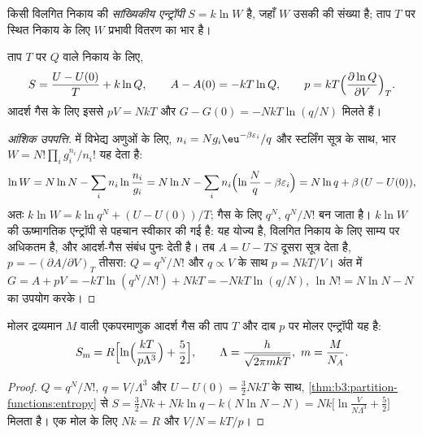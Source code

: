 \begin{definition}[सांख्यिकीय एन्ट्रॉपी]\label{def:b3:partition-functions:statistical-entropy}
किसी विलगित निकाय की \emph{सांख्यिकीय एन्ट्रॉपी}
$S = k\ln W$ है, जहाँ $W$ उसकी  की संख्या है; ताप
$T$ पर स्थित निकाय के लिए $W$ प्रभावी वितरण का भार है।
\end{definition}

\begin{theorem}[एन्ट्रॉपी और अन्य फलन]\label{thm:b3:partition-functions:entropy}
ताप $T$ पर  $Q$ वाले निकाय के लिए,
\[
  S = \frac{U - U(0)}{T} + k\ln Q, \qquad A - A(0) = -kT\ln Q, \qquad
  p = kT\Bigl(\frac{\partial\ln Q}{\partial V}\Bigr)_T .
\]
आदर्श गैस के लिए इससे $pV = NkT$ और $G - G(0) = -NkT\ln(q/N)$ मिलते हैं।
\end{theorem}

\begin{proof}[आंशिक उपपत्ति]
 में विभेद्य अणुओं के लिए, $n_i = Ng_i\eu^{-\beta\varepsilon_i}/q$
और स्टर्लिंग सूत्र के साथ, भार $W = N!\prod_ig_i^{n_i}/n_i!$ यह देता है:
\[
  \ln W = N\ln N - \sum_in_i\ln\frac{n_i}{g_i} = N\ln N - \sum_in_i\Bigl(\ln\frac Nq - \beta\varepsilon_i\Bigr)
        = N\ln q + \beta\,(U - U(0)),
\]
अतः $k\ln W = k\ln q^N + (U - U(0))/T$; गैस के लिए $q^N$, $q^N/N!$ बन जाता है।
$k\ln W$ की ऊष्मागतिक एन्ट्रॉपी से पहचान स्वीकार की गई है: यह
योज्य है, विलगित निकाय के लिए साम्य पर अधिकतम है, और
आदर्श-गैस संबंध पुनः देती है। तब $A = U - TS$ दूसरा सूत्र देता है, $p =
-(\partial A/\partial V)_T$ तीसरा: $Q = q^N/N!$ और $q \propto V$ के साथ $p = NkT/V$। अंत में
$G = A + pV = -kT\ln(q^N/N!) + NkT = -NkT\ln(q/N)$, $\ln N! = N\ln N - N$ का उपयोग करके।
\end{proof}

\begin{theorem}[सैकुर--टेट्रोड समीकरण]\label{thm:b3:partition-functions:sackur-tetrode}
मोलर द्रव्यमान $M$ वाली एकपरमाणुक आदर्श गैस की ताप $T$
और दाब $p$ पर मोलर एन्ट्रॉपी यह है:
\[
  S_{\mathrm m} = R\Bigl[\ln\Bigl(\frac{kT}{p\Lambda^3}\Bigr) + \frac52\Bigr],
  \qquad \Lambda = \frac{h}{\sqrt{2\pi mkT}},\ m = \frac{M}{N_A}.
\]
\end{theorem}

\begin{proof}
$Q = q^N/N!$, $q = V/\Lambda^3$ और $U - U(0) = \frac32NkT$ के साथ,
\cref{thm:b3:partition-functions:entropy} से $S = \frac32Nk + Nk\ln q - k(N\ln N - N) =
Nk\bigl[\ln\frac{V}{N\Lambda^3} + \frac52\bigr]$ मिलता है। एक मोल के लिए $Nk = R$ और $V/N = kT/p$।
\end{proof}

